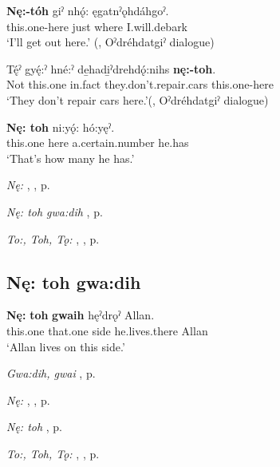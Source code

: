 \ea
\label{ex:npar119}
\gll \textbf{Nę:-tóh} giˀ nhǫ́: ęgatnˀǫhdáhgoˀ. \\
this.one-here just where I.will.debark\\
\glt ‘I’ll get out here.’ (\cite[339]{mithun_watewayestanih_1984}, Oˀdréhdatgiˀ dialogue)
\z

\ea
\label{ex:npar120}
\gll Tę́ˀ gyę́:ˀ hné:ˀ de̱hadi̱ˀdrehdǫ́:nihs \textbf{nę:-toh}. \\
Not this.one in.fact they.don’t.repair.cars this.one-here\\
\glt ‘They don’t repair cars here.’(\cite[339]{mithun_watewayestanih_1984}, Oˀdréhdatgiˀ dialogue)
\z

\ea
\label{ex:npar121}
\gll \textbf{Nę: toh} ni:yǫ́: hó:yęˀ. \\
this.one here a.certain.number he.has\\
\glt ‘That’s how many he has.’
\z

\begin{CayugaRelated}
\item \textit{Nę:} , , p. \pageref{p:[nę:] ‘this, these’}\\
\item \textit{Nę: toh gwa:dih} , p. \pageref{p:[nę: toh gwa:dih]}\\
\item \textit{To:, Toh, Tǫ:} , , p. \pageref{p:[to:] ‘there’, ‘that place’}
\end{CayugaRelated}

\subsection*{\textbf{Nę: toh gwa:dih} } \label{p:[nę: toh gwa:dih]}

\ea
\label{ex:npar114}
\gll \textbf{Nę:} \textbf{toh} \textbf{gwaih} hęˀdrǫˀ Allan. \\
this.one that.one side he.lives.there Allan\\
\glt ‘Allan lives on this side.’
\z

\begin{CayugaRelated}
\item \textit{Gwa:dih, gwai} , p. \pageref{p:[gwa:dih]}\\
\item \textit{Nę:} , , p. \pageref{p:[nę:] ‘this, these’}\\
\item \textit{Nę: toh} , p. \pageref{p:[nę: toh]}\\
\item \textit{To:, Toh, Tǫ:} , , p. \pageref{p:[to:] ‘there’, ‘that place’}
\end{CayugaRelated}

